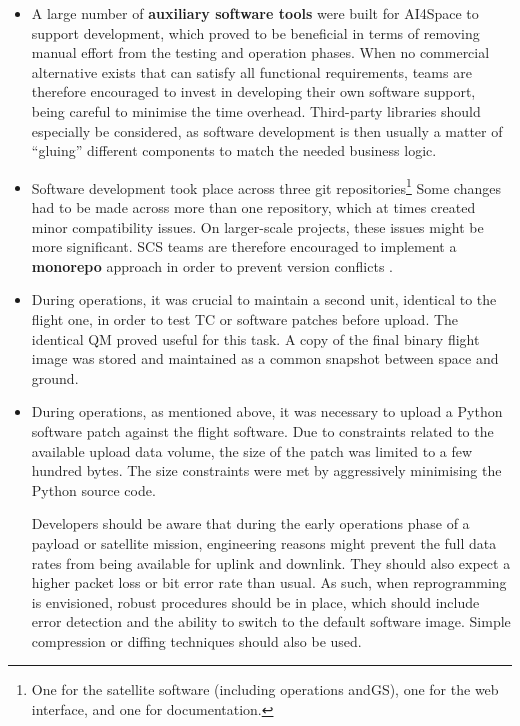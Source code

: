 \documentclass[a4paper,nobib,justified,final]{tufte-book}
\begin{document}
\begin{itemize}[itemsep=-1ex]
\item A large number of \textbf{auxiliary software tools} were built for AI4Space to support development, which proved to be beneficial in terms of removing manual effort from the testing and operation phases. When no commercial alternative exists that can satisfy all functional requirements, teams are therefore encouraged to invest in developing their own software support, being careful to minimise the time overhead. Third-party libraries should especially be considered, as software development is then usually a matter of ``gluing'' different components to match the needed business logic.

\item Software development took place across three git repositories\footnote{One for the satellite software (including operations and\acs{GS}), one for the web interface, and one for documentation.} Some changes had to be made across more than one repository, which at times created minor compatibility issues. On larger-scale projects, these issues might be more significant. \acs{SCS} teams are therefore encouraged to implement a \textbf{monorepo} approach in order to prevent version conflicts \autocite{WhyGoogleStores2016}.

\item During operations, it was crucial to maintain a second unit, identical to the flight one, in order to test \acs{TC} or software patches before upload. The identical \acl{QM} proved useful for this task. A copy of the final binary flight image was stored and maintained as a common snapshot between space and ground.

\item During operations, as mentioned above, it was necessary to upload a Python software patch against the flight software. Due to constraints related to the available upload data volume, the size of the patch was limited to a few hundred bytes. The size constraints were met by aggressively minimising the Python source code.

Developers should be aware that during the early operations phase of a payload or satellite mission, engineering reasons might prevent the full data rates from being available for uplink and downlink. They should also expect a higher packet loss or bit error rate than usual. As such, when reprogramming is envisioned, robust procedures should be in place, which should include error detection and the ability to switch to the default software image. Simple compression or diffing techniques should also be used.


\end{itemize}
\end{document}
